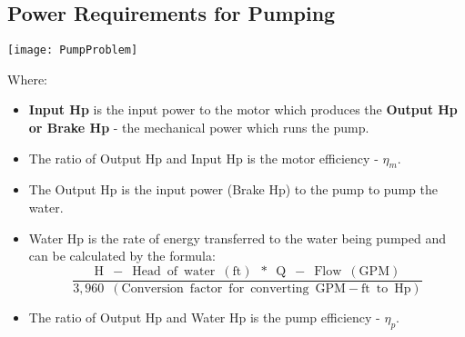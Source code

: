 %
%
%






\subsection{Power Requirements for Pumping}
\begin{center}
\texttt{[image: PumpProblem]}\\
\end{center}
Where:\\
\begin{itemize}
\item \textbf{Input Hp} is the input power to the motor which produces the \textbf{Output Hp or Brake Hp} - the mechanical power which runs the pump.  
\item The ratio of Output Hp and Input Hp is the motor efficiency - $\eta_m$.
\item The Output Hp is the input power (Brake Hp) to the pump to pump the water.
\item Water Hp is the rate of energy transferred to the water being pumped and can be calculated by the formula:\\
$$\dfrac{\mathrm{H \enspace - \enspace Head \enspace of \enspace water \enspace (ft) \enspace * \enspace Q \enspace - \enspace Flow \enspace (GPM)}}{3,960 \enspace \mathrm{(Conversion \enspace factor \enspace for \enspace converting \enspace GPM-ft \enspace to \enspace Hp)}}$$
\item The ratio of Output Hp and Water Hp is the pump efficiency - $\eta_p$.
\end{itemize}
